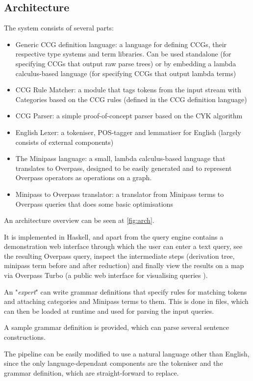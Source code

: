 \documentclass[main.tex]{subfiles}
\begin{document}
\subsection{Architecture}
The system consists of several parts:


\begin{itemize}
    \item Generic CCG definition language: a language for defining CCGs,
          their respective type systems and term libraries. Can be used
          standalone (for specifying CCGs that output raw parse trees)
          or by embedding a lambda calculus-based language (for specifying
          CCGs that output lambda terms)

    \item CCG Rule Matcher: a module that tags tokens from the input stream
          with Categories based on the CCG rules (defined in the CCG definition
          language)

    \item CCG Parser: a simple proof-of-concept parser based on the CYK
          algorithm

    \item English Lexer: a tokeniser, POS-tagger and lemmatiser for English
          (largely consists of external components)

    \item The Minipass language: a small, lambda calculus-based language
          that translates to Overpass, designed to be easily generated and
          to represent Overpass operators as operations on a graph.

    \item Minipass to Overpass translator: a translator from Minipass terms
          to Overpass queries that does some basic optimisations
\end{itemize}

An architecture overview can be seen at \cref{fig:arch}.

It is implemented in Haskell, and apart from the query engine contains
a demonstration web interface through which the user can enter a text query,
see the resulting Overpass query, inspect the intermediate steps (derivation
tree, minipass term before and after reduction) and finally view the results
on a map via Overpass Turbo (a public web interface for visualising queries
\cite{overpassturbo}).

An "\emph{expert}" can write grammar definitions that specify rules for matching
tokens and attaching categories and Minipass terms to them. This is done in
 files, which can then be loaded at runtime and used for parsing the
input queries.

A sample grammar definition is provided, which can parse several sentence
constructions.

The pipeline can be easily modified to use a natural language other than
English, since the only language-dependant components are the tokeniser and
the grammar definition, which are straight-forward to replace.
\end{document}

